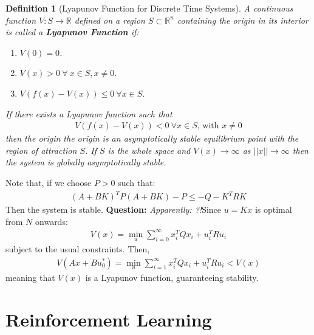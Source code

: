 \documentclass[a4paper]{book}
\newcommand{\question}[1]{{\color{red}\textbf{Question: }\emph{#1}}}
\newtheorem{definition}[theorem]{Definition}
\newcommand{\ix}[1]{%
  \leavevmode %
  \marginpar{\small\emph{#1}}%
}
\begin{document}
\begin{definition}[Lyapunov Function for Discrete Time Systems]
	\ix{Lyapunov Function}A continuous function $V: S \rightarrow \mathbb{R}$ defined on a region $S \subset \mathbb{R}^n$ containing the origin in its interior is called a \textbf{Lyapunov Function} if:
	\begin{enumerate}
		\item $V(0) = 0$.
		\item $V(x) > 0\ \forall\ x\in S, x\neq 0$.
		\item $V(f(x) - V(x)) \leq 0\ \forall x \in S$.  
	\end{enumerate}
If there exists a Lyapunov function such that \begin{align*}
V(f(x) - V(x)) < 0\ \forall x \in S\text{, with } x\neq 0
\end{align*}
then the origin the origin is an asymptotically stable equilibrium point with the region of attraction $S$. If $S$ is the whole space and $V(x) \rightarrow \infty$ as $||x|| \rightarrow \infty$ then the system is globally asymptotically stable. 
\end{definition}
Note that, if  we choose $P > 0$ such that:
\begin{align}
(A + BK)^T P (A+BK) - P \leq -Q - K^T R K
\end{align}
Then the system is stable. \question{Apparently: ?!}Since $u=Kx$ is optimal from $N$ onwards:
\begin{align}
V(x) = \min_u \sum_{i=0}^\infty x_i^T Q x_i + u_i^T R u_i
\end{align}
subject to the usual constraints. Then, 
\begin{align}
V(Ax + Bu_0^*) = \min_u \sum_{i=1}^\infty x_i^T Q x_i + u_i^T R u_i < V(x)
\end{align}
meaning that $V(x)$ is a Lyapunov function, guaranteeing stability. 

\chapter{Reinforcement Learning}
\end{document}
